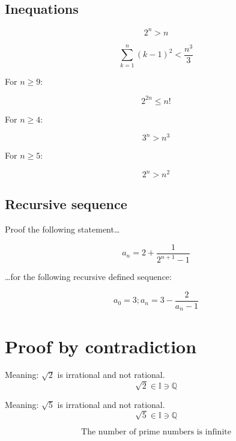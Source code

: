 \documentclass[11pt,a4paper,twocolumn]{article}
\theoremstyle{area}
\begin{document}
\subsection{Inequations}

\begin{equation}
    2^n > n
\end{equation}

\begin{equation}
    \sum_{k=1}^n (k-1)^2 < \frac{n^3}{3}
\end{equation}

For $n \geq 9$:

\begin{equation}
    2^{2n} \leq n!
\end{equation}

For $n \geq 4$:

\begin{equation}
    3^n > n^3
\end{equation}

For $n \geq 5$:

\begin{equation}
    2^n > n^2
\end{equation}

\subsection{Recursive sequence}

Proof the following statement\dots

\begin{equation}
    a_n = 2 + \frac{1}{2^{n+1} - 1}
\end{equation}

\dots for the following recursive defined sequence:

\begin{equation}
    a_0 = 3; a_n = 3 - \frac{2}{a_n - 1}
\end{equation}

\section{Proof by contradiction}

Meaning: $\sqrt{2}$ is irrational and not rational.
\begin{equation}
    \sqrt{2} \in \mathbb{I} \ni \mathbb{Q}
\end{equation}

Meaning: $\sqrt{5}$ is irrational and not rational.
\begin{equation}
    \sqrt{5} \in \mathbb{I} \ni \mathbb{Q}
\end{equation}

\begin{equation}
    \text{The number of prime numbers is infinite}
\end{equation}
\end{document}
